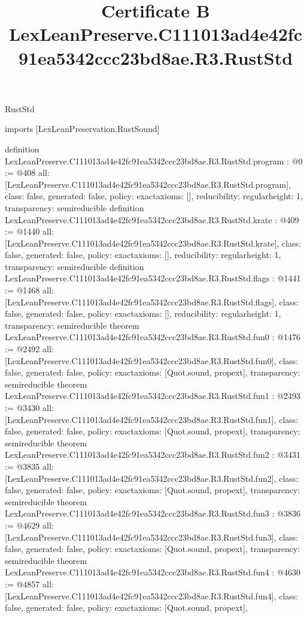 \begin{lexlean}{RustStd}
\title{Certificate B LexLeanPreserve.C111013ad4e42fc91ea5342ccc23bd8ae.R3.RustStd}
\begin{coremodule}
imports [LexLeanPreservation.RustSound]

definition LexLeanPreserve.C111013ad4e42fc91ea5342ccc23bd8ae.R3.RustStd.program : @0 := @408 {
  all: [LexLeanPreserve.C111013ad4e42fc91ea5342ccc23bd8ae.R3.RustStd.program],
  class: false,
  generated: false,
  policy: exact{axioms: []},
  reducibility: regular{height: 1},
  transparency: semireducible
}
definition LexLeanPreserve.C111013ad4e42fc91ea5342ccc23bd8ae.R3.RustStd.krate : @409 := @1440 {
  all: [LexLeanPreserve.C111013ad4e42fc91ea5342ccc23bd8ae.R3.RustStd.krate],
  class: false,
  generated: false,
  policy: exact{axioms: []},
  reducibility: regular{height: 1},
  transparency: semireducible
}
definition LexLeanPreserve.C111013ad4e42fc91ea5342ccc23bd8ae.R3.RustStd.flags : @1441 := @1468 {
  all: [LexLeanPreserve.C111013ad4e42fc91ea5342ccc23bd8ae.R3.RustStd.flags],
  class: false,
  generated: false,
  policy: exact{axioms: []},
  reducibility: regular{height: 1},
  transparency: semireducible
}
theorem LexLeanPreserve.C111013ad4e42fc91ea5342ccc23bd8ae.R3.RustStd.fun0 : @1476 := @2492 {
  all: [LexLeanPreserve.C111013ad4e42fc91ea5342ccc23bd8ae.R3.RustStd.fun0],
  class: false,
  generated: false,
  policy: exact{axioms: [Quot.sound, propext]},
  transparency: semireducible
}
theorem LexLeanPreserve.C111013ad4e42fc91ea5342ccc23bd8ae.R3.RustStd.fun1 : @2493 := @3430 {
  all: [LexLeanPreserve.C111013ad4e42fc91ea5342ccc23bd8ae.R3.RustStd.fun1],
  class: false,
  generated: false,
  policy: exact{axioms: [Quot.sound, propext]},
  transparency: semireducible
}
theorem LexLeanPreserve.C111013ad4e42fc91ea5342ccc23bd8ae.R3.RustStd.fun2 : @3431 := @3835 {
  all: [LexLeanPreserve.C111013ad4e42fc91ea5342ccc23bd8ae.R3.RustStd.fun2],
  class: false,
  generated: false,
  policy: exact{axioms: [Quot.sound, propext]},
  transparency: semireducible
}
theorem LexLeanPreserve.C111013ad4e42fc91ea5342ccc23bd8ae.R3.RustStd.fun3 : @3836 := @4629 {
  all: [LexLeanPreserve.C111013ad4e42fc91ea5342ccc23bd8ae.R3.RustStd.fun3],
  class: false,
  generated: false,
  policy: exact{axioms: [Quot.sound, propext]},
  transparency: semireducible
}
theorem LexLeanPreserve.C111013ad4e42fc91ea5342ccc23bd8ae.R3.RustStd.fun4 : @4630 := @4857 {
  all: [LexLeanPreserve.C111013ad4e42fc91ea5342ccc23bd8ae.R3.RustStd.fun4],
  class: false,
  generated: false,
  policy: exact{axioms: [Quot.sound, propext]},
}
\end{coremodule}
\end{lexlean}
